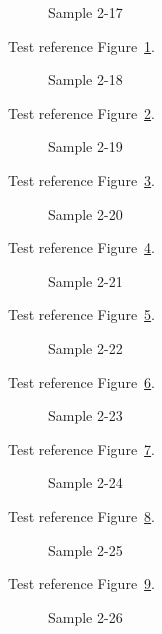 \begin{figure}[tbhp]
\caption{Sample 2-17}
\label{fig:sample-2-17}
\end{figure}

Test reference Figure~\ref{fig:sample-2-17}.

\begin{figure}[tbhp]
\caption{Sample 2-18}
\label{fig:sample-2-18}
\end{figure}

Test reference Figure~\ref{fig:sample-2-18}.

\begin{figure}[tbhp]
\caption{Sample 2-19}
\label{fig:sample-2-19}
\end{figure}

Test reference Figure~\ref{fig:sample-2-19}.

\begin{figure}[tbhp]
\caption{Sample 2-20}
\label{fig:sample-2-20}
\end{figure}

Test reference Figure~\ref{fig:sample-2-20}.

\begin{figure}[tbhp]
\caption{Sample 2-21}
\label{fig:sample-2-21}
\end{figure}

Test reference Figure~\ref{fig:sample-2-21}.

\begin{figure}[tbhp]
\caption{Sample 2-22}
\label{fig:sample-2-22}
\end{figure}

Test reference Figure~\ref{fig:sample-2-22}.

\begin{figure}[tbhp]
\caption{Sample 2-23}
\label{fig:sample-2-23}
\end{figure}

Test reference Figure~\ref{fig:sample-2-23}.

\begin{figure}[tbhp]
\caption{Sample 2-24}
\label{fig:sample-2-24}
\end{figure}

Test reference Figure~\ref{fig:sample-2-24}.

\begin{figure}[tbhp]
\caption{Sample 2-25}
\label{fig:sample-2-25}
\end{figure}

Test reference Figure~\ref{fig:sample-2-25}.

\begin{figure}[tbhp]
\caption{Sample 2-26}
\label{fig:sample-2-26}
\end{figure}

